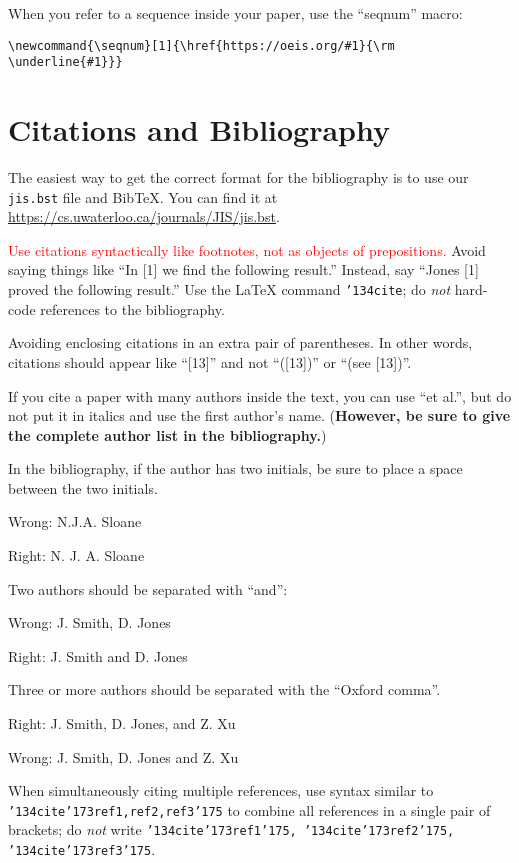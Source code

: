 \documentclass[12pt]{article}
\begin{document}
When you refer to a sequence inside your paper, use the ``seqnum'' macro:
\begin{verbatim}
\newcommand{\seqnum}[1]{\href{https://oeis.org/#1}{\rm \underline{#1}}}
\end{verbatim}


\section{Citations and Bibliography}

The easiest way to get the correct format for the bibliography
is to use our {\tt jis.bst} file and BibTeX.   You can find it at
\url{https://cs.uwaterloo.ca/journals/JIS/jis.bst}.

     \textcolor{red}{Use citations syntactically like footnotes,
not as objects of prepositions.}
Avoid saying things like ``In [1] we find the following result.''  Instead,
say ``Jones [1] proved the following result.''  Use the LaTeX command
{\tt \char'134cite}; do {\it not\/} hard-code references to the bibliography.

	Avoiding enclosing citations in an extra pair of parentheses. 
In other words, citations should appear like ``[13]'' and not ``([13])'' or
``(see [13])''.

If you cite a paper with many authors inside the
text, you can use ``et al.'', but do
not put it in italics and use the first author's name.  ({\bf However, be sure
to give the complete author list in the bibliography.})

      In the bibliography, if the author has two initials, be sure
to place a space between the two initials. 

Wrong:  N.J.A. Sloane

Right:  N. J. A. Sloane

\medskip

      Two authors should be separated with ``and'':

Wrong:  J. Smith, D. Jones

Right:  J. Smith and D. Jones

\medskip

      Three or more authors should be separated with the ``Oxford
comma''.

Right:  J. Smith, D. Jones, and Z. Xu

Wrong:  J. Smith, D. Jones and Z. Xu

\medskip

      When simultaneously citing multiple references, use syntax
similar to {\tt \char'134cite\char'173ref1,ref2,ref3\char'175} to combine
all references in a single pair of brackets; do {\it not\/} write
{\tt \char'134cite\char'173ref1\char'175, \char'134cite\char'173ref2\char'175,
\char'134cite\char'173ref3\char'175}.
\end{document}
